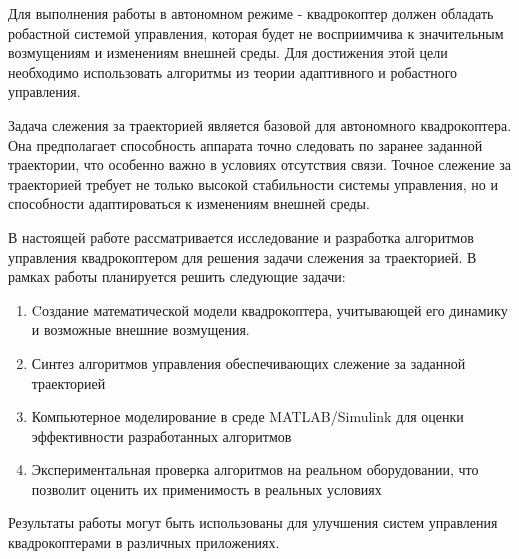 Для выполнения работы в автономном режиме - квадрокоптер должен обладать 
робастной системой управления, которая будет не восприимчива к значительным 
возмущениям и изменениям внешней среды. Для достижения этой цели необходимо
использовать алгоритмы из теории адаптивного и робастного управления.


Задача слежения за траекторией является базовой для 
автономного квадрокоптера. Она предполагает 
способность аппарата точно следовать по заранее заданной 
траектории, что особенно важно в условиях отсутствия связи. 
Точное слежение за траекторией требует 
не только высокой стабильности системы управления, 
но и способности адаптироваться к изменениям внешней среды.


В настоящей работе рассматривается исследование и разработка 
алгоритмов управления квадрокоптером для решения задачи слежения 
за траекторией. В рамках работы планируется решить следующие задачи:

\begin{enumerate}
    \item Cоздание математической модели квадрокоптера, учитывающей его динамику и возможные 
    внешние возмущения.
    \item Синтез алгоритмов управления обеспечивающих слежение за заданной траекторией
    \item Компьютерное моделирование в среде MATLAB/Simulink 
    для оценки эффективности разработанных алгоритмов
    \item Экспериментальная проверка алгоритмов на реальном 
    оборудовании, что позволит оценить их применимость в реальных условиях
\end{enumerate}


Результаты работы могут быть использованы для улучшения систем управления 
квадрокоптерами в различных приложениях.
  




\endinput
